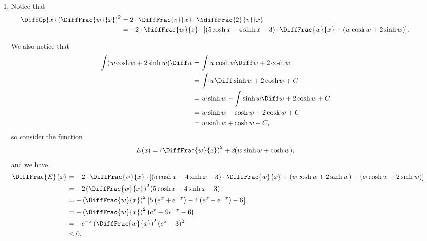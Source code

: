 \begin{enumerate}
    \item Notice that
          \begin{align*}
              \DiffOp{x} \left(\DiffFrac{w}{x}\right)^2 & = 2 \cdot \DiffFrac{v}{x} \cdot \NdiffFrac{2}{v}{x}                                                                                               \\
                                                        & = - 2 \cdot \DiffFrac{w}{x} \cdot \left[\left(5 \cosh x - 4 \sinh x - 3\right) \cdot \DiffFrac{w}{x} + \left(w \cosh w + 2 \sinh w\right)\right].
          \end{align*}

          We also notice that
          \begin{align*}
              \int (w \cosh w + 2 \sinh w) \Diff w & = \int w \cosh w \Diff w + 2 \cosh w               \\
                                                   & = \int w \Diff \sinh w + 2 \cosh w + C             \\
                                                   & = w \sinh w - \int \sinh w \Diff w + 2 \cosh w + C \\
                                                   & = w \sinh w - \cosh w + 2 \cosh w + C              \\
                                                   & = w \sinh w + \cosh w + C,
          \end{align*}
          so consider the function
          \[
              E(x) = \left(\DiffFrac{w}{x}\right)^2 + 2(w \sinh w + \cosh w),
          \]
          and we have
          \begin{align*}
              \DiffFrac{E}{x} & = - 2 \cdot \DiffFrac{w}{x} \cdot \left[\left(5 \cosh x - 4 \sinh x - 3\right) \cdot \DiffFrac{w}{x} + \left(w \cosh w + 2 \sinh w\right) - \left(w \cosh w + 2 \sinh w\right)\right] \\
                              & = -2 \left(\DiffFrac{w}{x}\right)^2 \left(5 \cosh x - 4 \sinh x - 3\right)                                                                                                            \\
                              & = - \left(\DiffFrac{w}{x}\right)^2 \left[5 \left(e^x + e^{-x}\right) - 4 \left(e^x - e^{-x}\right) - 6\right]                                                                         \\
                              & = - \left(\DiffFrac{w}{x}\right)^2 \left(e^x + 9e^{-x} - 6\right)                                                                                                                     \\
                              & = - e^{-x} \left(\DiffFrac{w}{x}\right)^2 (e^x - 3)^2                                                                                                                                 \\
                              & \leq 0.
          \end{align*}


\end{enumerate}
